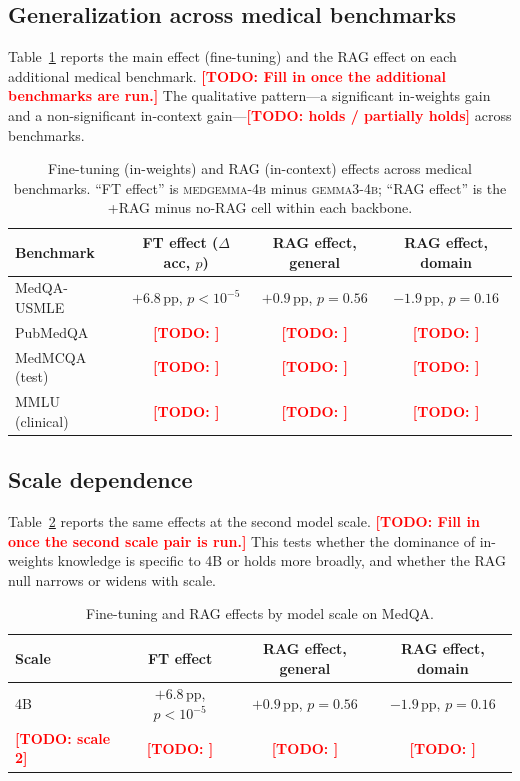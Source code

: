 \documentclass[11pt,a4paper]{article}
\newcommand{\TODO}[1]{\textcolor{red}{\textbf{[TODO: #1]}}}
\begin{document}
\subsection{Generalization across medical benchmarks}

Table~\ref{tab:benchmarks} reports the main effect (fine-tuning) and the RAG
effect on each additional medical benchmark. \TODO{Fill in once the additional
benchmarks are run.} The qualitative pattern---a significant in-weights gain and
a non-significant in-context gain---\TODO{holds / partially holds} across
benchmarks.

\begin{table}[h]
\centering
\small
\begin{tabular}{lccc}
\toprule
\textbf{Benchmark} & \textbf{FT effect ($\Delta$acc, $p$)} & \textbf{RAG effect, general} & \textbf{RAG effect, domain} \\
\midrule
MedQA-USMLE & $+6.8$\,pp, $p<10^{-5}$ & $+0.9$\,pp, $p{=}0.56$ & $-1.9$\,pp, $p{=}0.16$ \\
PubMedQA    & \TODO{} & \TODO{} & \TODO{} \\
MedMCQA (test) & \TODO{} & \TODO{} & \TODO{} \\
MMLU (clinical) & \TODO{} & \TODO{} & \TODO{} \\
\bottomrule
\end{tabular}
\caption{Fine-tuning (in-weights) and RAG (in-context) effects across medical
benchmarks. ``FT effect'' is \textsc{medgemma-4b} minus \textsc{gemma3-4b};
``RAG effect'' is the +RAG minus no-RAG cell within each backbone.}
\label{tab:benchmarks}
\end{table}

\subsection{Scale dependence}

Table~\ref{tab:scale} reports the same effects at the second model scale. \TODO{
Fill in once the second scale pair is run.} This tests whether the dominance of
in-weights knowledge is specific to 4B or holds more broadly, and whether the RAG
null narrows or widens with scale.

\begin{table}[h]
\centering
\small
\begin{tabular}{lccc}
\toprule
\textbf{Scale} & \textbf{FT effect} & \textbf{RAG effect, general} & \textbf{RAG effect, domain} \\
\midrule
4B  & $+6.8$\,pp, $p<10^{-5}$ & $+0.9$\,pp, $p{=}0.56$ & $-1.9$\,pp, $p{=}0.16$ \\
\TODO{scale 2} & \TODO{} & \TODO{} & \TODO{} \\
\bottomrule
\end{tabular}
\caption{Fine-tuning and RAG effects by model scale on MedQA.}
\label{tab:scale}
\end{table}
\end{document}
